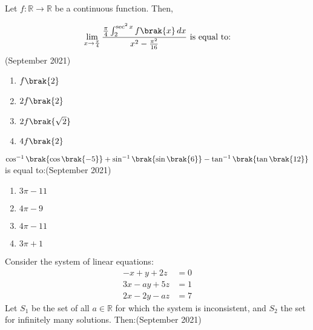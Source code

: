 \iffalse
\title{assignment}
\author{EE24BTECH11020}
\section{mcq-single}
\fi



\item Let $f : \mathbb{R} \to \mathbb{R}$ be a continuous function. Then,

\begin{align*}
\lim_{x \to \frac{\pi}{4}} \frac{\frac{\pi}{4} \int_{2}^{\sec^2 x} f\brak{x} \, dx}{x^2 - \frac{\pi^2}{16}} \text{  is equal to:}
\end{align*}
\hfill (September 2021)


\begin{multicols}{4}
\begin{enumerate}
    \item $f\brak{2}$
    \item $2f\brak{2}$
    \item $2f\brak{\sqrt{2}}$
    \item $4f\brak{2}$
\end{enumerate}
\end{multicols}

\item $\cos^{-1}\brak{\cos\brak{-5}} + \sin^{-1}\brak{\sin\brak{6}} - \tan^{-1}\brak{\tan\brak{12}}$ is equal to:\hfill (September 2021)
\begin{multicols}{2}
    \begin{enumerate}
    \item $3\pi - 11$
    \item $4\pi - 9$
    \item $4\pi - 11$
    \item $3\pi + 1$
\end{enumerate}
\end{multicols}


\item Consider the system of linear equations:
\begin{align*}
-x + y + 2z &= 0 \\
3x - ay + 5z &= 1 \\
2x - 2y - az &= 7
\end{align*}
Let $S_1$ be the set of all $a \in \mathbb{R}$ for which the system is inconsistent, and $S_2$ the set for infinitely many solutions. Then:\hfill (September 2021)

